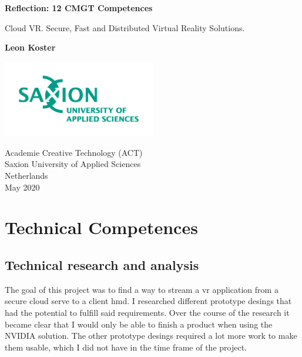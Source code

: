 \documentclass[]{article}
\begin{document}
\begin{titlepage}
   \begin{center}
       \vspace*{1cm}

       \textbf{Reflection: 12 CMGT Competences}

       \vspace{0.5cm}
       Cloud VR. Secure, Fast and Distributed Virtual Reality Solutions.
       \vspace{1.5cm}

       \textbf{Leon Koster}

       \vfill
            
       \vspace{0.8cm}
     
      \includegraphics[width=0.5\textwidth]{university}
            
       Academie Creative Technology (ACT)\\
       Saxion University of Applied Sciences\\
       Netherlands\\
       May 2020
            
   \end{center}
\end{titlepage}

\tableofcontents
\printnoidxglossary[type=\acronymtype]
\newpage

\section{Technical Competences}
\subsection{Technical research and analysis}
The goal of this project was to find a way to stream a \acrshort{vr}  application from a secure cloud serve to a client \acrshort{hmd}. I researched different prototype desings that had the potential to fulfill said requirements. Over the course of the research it became clear that I would only be able to finish a product when using the NVIDIA solution. The other prototype desings required a lot more work to make them usable, which I did not have in the time frame of the project. 
\end{document}
